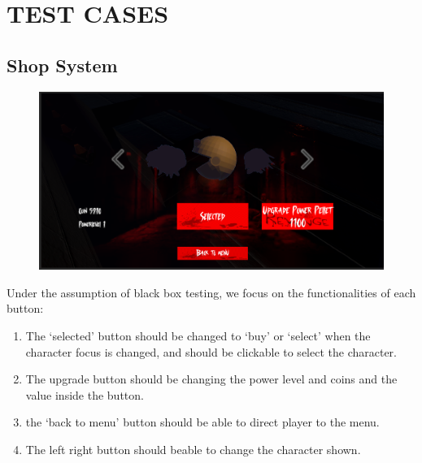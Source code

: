 \documentclass[11pt]{article}
\begin{document}
    \section{TEST CASES}

    \subsection{Shop System}

    \begin{figure}[H]
        \centering
        \includegraphics*[scale=0.4]{Shop.png}
    \end{figure}

    Under the assumption of black box testing, we focus on the functionalities of each button:

    \begin{enumerate}
        \item The `selected' button should be changed to `buy' or `select' when the character focus is changed, and should be clickable to select the character.
        \item The upgrade button should be changing the power level and coins and the value inside the button.
        \item the `back to menu' button should be able to direct player to the menu.
        \item The left right button should beable to change the character shown.
    \end{enumerate}
\end{document}
